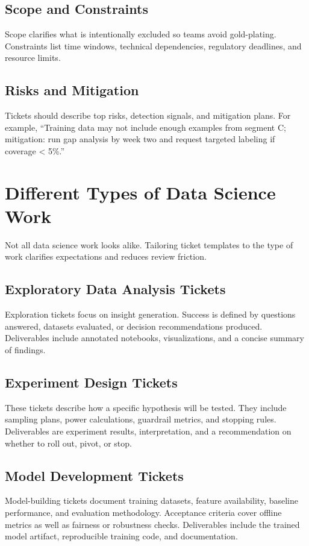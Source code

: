 \subsection{Scope and Constraints}
Scope clarifies what is intentionally excluded so teams avoid gold-plating. Constraints list time windows, technical dependencies, regulatory deadlines, and resource limits.

\subsection{Risks and Mitigation}
Tickets should describe top risks, detection signals, and mitigation plans. For example, ``Training data may not include enough examples from segment C; mitigation: run gap analysis by week two and request targeted labeling if coverage \textless{} 5\%.''

\section{Different Types of Data Science Work}
\label{sec:ds-work-types}

Not all data science work looks alike. Tailoring ticket templates to the type of work clarifies expectations and reduces review friction.

\subsection{Exploratory Data Analysis Tickets}
Exploration tickets focus on insight generation. Success is defined by questions answered, datasets evaluated, or decision recommendations produced. Deliverables include annotated notebooks, visualizations, and a concise summary of findings.

\subsection{Experiment Design Tickets}
These tickets describe how a specific hypothesis will be tested. They include sampling plans, power calculations, guardrail metrics, and stopping rules. Deliverables are experiment results, interpretation, and a recommendation on whether to roll out, pivot, or stop.

\subsection{Model Development Tickets}
Model-building tickets document training datasets, feature availability, baseline performance, and evaluation methodology. Acceptance criteria cover offline metrics as well as fairness or robustness checks. Deliverables include the trained model artifact, reproducible training code, and documentation.

